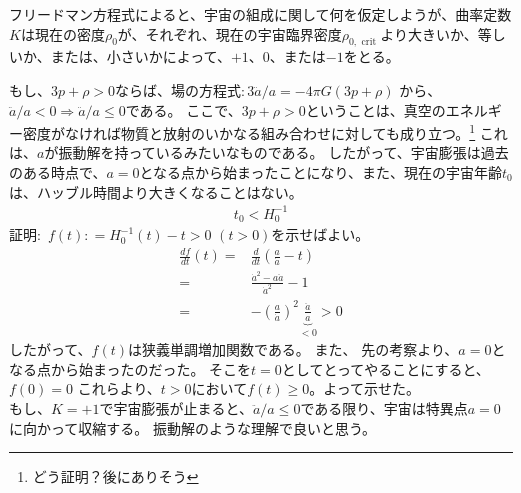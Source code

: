 \documentclass[11pt]{ltjsarticle}
\theoremstyle{plain}
\theoremstyle{break}
\begin{document}
フリードマン方程式によると、宇宙の組成に関して何を仮定しようが、曲率定数 $K$は現在の密度$\rho_0$が、それぞれ、現在の宇宙臨界密度$ \rho_{0, \text { crit }} $より大きいか、等しいか、または、小さいかによって、$+1$、$0$、または$-1$をとる。

もし、$3p + \rho > 0$ならば、場の方程式$:3\ddot{a}/{a}=-4 \pi G(3 p+\rho)$ から、$\ddot{a}/{a} < 0 \Rightarrow \ddot{a}/{a} \leq 0 $である。
ここで、$3p + \rho > 0$ということは、真空のエネルギー密度がなければ物質と放射のいかなる組み合わせに対しても成り立つ。\footnote{どう証明？後にありそう}
これは、$a$が振動解を持っているみたいなものである。
したがって、宇宙膨張は過去のある時点で、$a=0$となる点から始まったことになり、また、現在の宇宙年齢$t_0$は、ハッブル時間より大きくなることはない。
\begin{align*}
  t_0 < H_0^{-1}
\end{align*}%
証明:\,  $f(t): = H_0^{-1} (t) - t > 0 \,\, (t >0)$を示せばよい。 
\begin{align}
 \frac{d f}{dt}(t)
   =& \frac{d}{dt} ( \frac{a}{\dot{a}} -t)\\
   =& \frac{\dot{a}^2 - a \ddot{a}}{\dot{a}^2} -1\\
   =& - \left(  \frac{a}{\dot{a}} \right)^2  \underbrace{\frac{\ddot{a}}{a}}_{<0} >0
   \end{align}%
したがって、$f(t)$は狭義単調増加関数である。
また、
先の考察より、$a=0$となる点から始まったのだった。
そこを$t=0$としてとってやることにすると、$f(0)=0$
これらより、$t>0$において$f(t) \geq 0$。よって示せた。 \\
\noindent
もし、$K = +1$で宇宙膨張が止まると、$\ddot{a}/{a} \leq 0$である限り、宇宙は特異点$a = 0$に向かって収縮する。
振動解のような理解で良いと思う。
\end{document}
